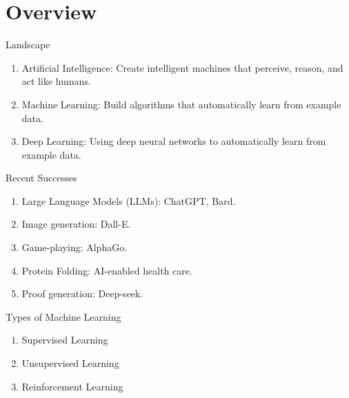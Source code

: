 \documentclass{beamer}
\begin{document}
\begin{frame}   
\titlepage
\end{frame}





\section{Overview}




\begin{frame}[t]{Landscape}
  \begin{enumerate}
    \item Artificial Intelligence: Create intelligent machines that perceive, reason, and act like humans. 
    \item Machine Learning: Build algorithms that automatically learn from example data.
    \item Deep Learning: Using deep neural networks to automatically learn from example data.
  \end{enumerate}
\end{frame}


\begin{frame}[t]{Recent Successes}
  \begin{enumerate}
    \item Large Language Models (LLMs): ChatGPT, Bard.
    \item Image generation: Dall-E.
    \item Game-playing: AlphaGo.
    \item Protein Folding: AI-enabled health care.
    \item Proof generation: Deep-seek.
  \end{enumerate}
\end{frame}


\begin{frame}[t]{Types of Machine Learning}
  \begin{enumerate}
    \item Supervised Learning
    \item Unsupervised Learning
    \item Reinforcement Learning
  \end{enumerate}
\end{frame}
\end{document}
